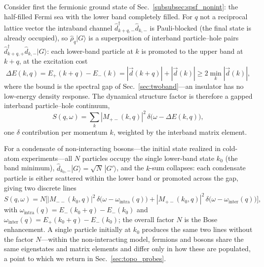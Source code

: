 \documentclass[onecolumn,aps,prl,superscriptaddress,longbibliography]{revtex4-2}
\begin{document}
Consider first the fermionic ground state of Sec.~\ref{subsubsec:spsf_nonint}: the half-filled Fermi sea with the lower band completely filled. For $q$ not a reciprocal lattice vector the intraband channel $\hat d_{k+q,-}^\dagger\hat d_{k,-}$ is Pauli-blocked (the final state is already occupied), so $\hat\rho_q|G\rangle$ is a superposition of interband particle--hole pairs $\hat d_{k+q,+}^\dagger\hat d_{k,-}|G\rangle$: each lower-band particle at $k$ is promoted to the upper band at $k+q$, at the excitation cost
\begin{equation}\label{eq:bragg_excitation}
  \Delta E(k,q) = E_+(k+q)-E_-(k) = |\vec d(k+q)|+|\vec d(k)| \geq 2\min_k|\vec d(k)|,
\end{equation}
where the bound is the spectral gap of Sec.~\ref{sec:twoband}---an insulator has no low-energy density response. The dynamical structure factor is therefore a gapped interband particle--hole continuum,
\begin{equation}\label{eq:bragg_fermion}
  S(q,\omega) = \sum_k |M_{+-}(k,q)|^2\, \delta\big(\omega-\Delta E(k,q)\big),
\end{equation}
one $\delta$ contribution per momentum $k$, weighted by the interband matrix element.

For a condensate of non-interacting bosons---the initial state realized in cold-atom experiments---all $N$ particles occupy the single lower-band state $k_0$ (the band minimum), $\hat d_{k_0,-}|G\rangle=\sqrt{N}\,|G'\rangle$, and the $k$-sum collapses: each condensate particle is either scattered within the lower band or promoted across the gap, giving two discrete lines
\begin{equation}\label{eq:bragg_bec}
  S(q,\omega) = N\Big[|M_{--}(k_0,q)|^2\,\delta\big(\omega-\omega_{\mathrm{intra}}(q)\big) + |M_{+-}(k_0,q)|^2\,\delta\big(\omega-\omega_{\mathrm{inter}}(q)\big)\Big],
\end{equation}
with $\omega_{\mathrm{intra}}(q)=E_-(k_0+q)-E_-(k_0)$ and $\omega_{\mathrm{inter}}(q)=E_+(k_0+q)-E_-(k_0)$; the overall factor $N$ is the Bose enhancement. A single particle initially at $k_0$ produces the same two lines without the factor $N$---within the non-interacting model, fermions and bosons share the same eigenstates and matrix elements and differ only in how these are populated, a point to which we return in Sec.~\ref{sec:topo_probes}.
\end{document}
